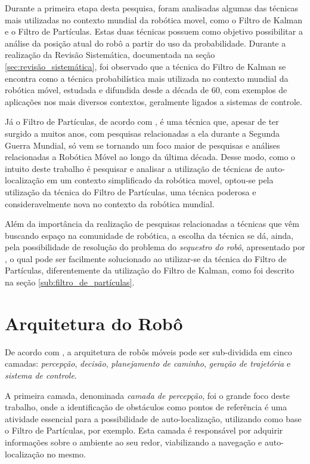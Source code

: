 	Durante a primeira etapa desta pesquisa, foram analisadas algumas das técnicas mais utilizadas no contexto mundial da robótica movel, como o Filtro de Kalman e
	o Filtro de Partículas. Estas duas técnicas possuem como objetivo possibilitar a análise da posição atual do robô a partir do uso da probabilidade. Durante a realização
	da Revisão Sistemática, documentada na seção \ref{sec:revisão_sistemática}, foi observado que a técnica do Filtro de Kalman se encontra
	como a técnica probabilística mais utilizada no contexto mundial da robótica móvel, estudada e difundida desde a década de 60, com exemplos de aplicações
	nos mais diversos contextos, geralmente ligados a sistemas de controle.

	Já o Filtro de Partículas, de acordo com \cite{sequestro}, é uma técnica que, apesar de ter surgido a muitos anos, com
	pesquisas relacionadas a ela durante a Segunda Guerra Mundial, só vem se tornando um foco maior de pesquisas e análises relacionadas
	a Robótica Móvel ao longo da última década. Desse modo, como o intuito deste trabalho é pesquisar e analisar a utilização de técnicas de auto-localização em um contexto
	simplificado da robótica movel, optou-se pela utilização da técnica do Filtro de Partículas, uma técnica poderosa e consideravelmente nova no contexto da
	robótica mundial.

	Além da importância da realização de pesquisas relacionadas a técnicas que vêm buscando espaço na comunidade de robótica, a escolha da técnica se dá, ainda,
	pela possibilidade de resolução do problema do \textit{sequestro do robô}, apresentado por \cite{sequestro}, o qual pode ser facilmente solucionado ao utilizar-se da técnica do
	Filtro de Partículas, diferentemente da utilização do Filtro de Kalman, como foi descrito na seção \ref{sub:filtro_de_partículas}.

\section{Arquitetura do Robô}

De acordo com \cite{vieira}, a arquitetura de robôs móveis pode ser sub-dividida em cinco camadas: \textit{percepção}, \textit{decisão}, \textit{planejamento de caminho}, \textit{geração de trajetória} e \textit{sistema de controle}.

A primeira camada, denominada \textit{camada de percepção}, foi o grande foco deste trabalho, onde a identificação de obstáculos como pontos de referência é uma atividade essencial para a possibilidade de auto-localização, utilizando como base o Filtro de Partículas, por exemplo. Esta camada é responsável por adquirir informações sobre o ambiente ao seu redor, viabilizando a navegação e auto-localização no mesmo.


